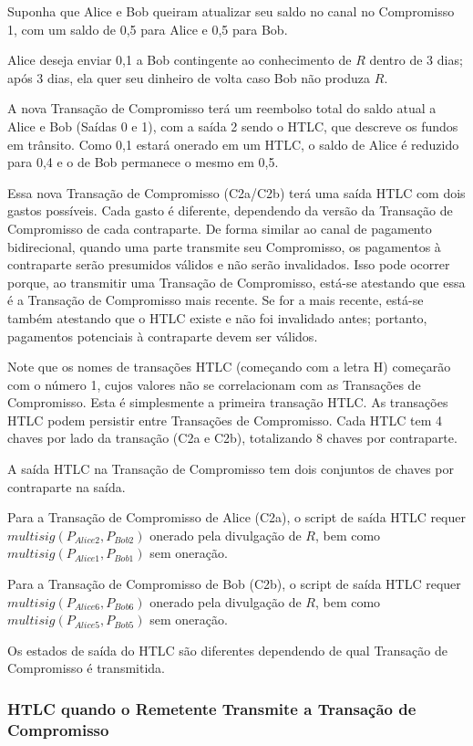 \documentclass[letterpaper,11pt]{article}
\begin{document}
Suponha que Alice e Bob queiram atualizar seu saldo no canal no
Compromisso 1, com um saldo de 0,5 para Alice e 0,5 para Bob.

Alice deseja enviar 0,1 a Bob contingente ao conhecimento de $R$ dentro de
3 dias; após 3 dias, ela quer seu dinheiro de volta caso Bob não produza
$R$.

A nova Transação de Compromisso terá um reembolso total do saldo atual a
Alice e Bob (Saídas 0 e 1), com a saída 2 sendo o HTLC, que descreve os
fundos em trânsito. Como 0,1 estará onerado em um HTLC, o saldo de Alice é
reduzido para 0,4 e o de Bob permanece o mesmo em 0,5.

Essa nova Transação de Compromisso (C2a/C2b) terá uma saída HTLC com dois
gastos possíveis. Cada gasto é diferente, dependendo da versão da Transação
de Compromisso de cada contraparte. De forma similar ao canal de
pagamento bidirecional, quando uma parte transmite seu Compromisso, os
pagamentos à contraparte serão presumidos válidos e não serão invalidados.
Isso pode ocorrer porque, ao transmitir uma Transação de Compromisso,
está-se atestando que essa é a Transação de Compromisso mais recente. Se
for a mais recente, está-se também atestando que o HTLC existe e não foi
invalidado antes; portanto, pagamentos potenciais à contraparte devem ser
válidos.

Note que os nomes de transações HTLC (começando com a letra H) começarão
com o número 1, cujos valores não se correlacionam com as Transações de
Compromisso. Esta é simplesmente a primeira transação HTLC. As transações
HTLC podem persistir entre Transações de Compromisso. Cada HTLC tem 4
chaves por lado da transação (C2a e C2b), totalizando 8 chaves por
contraparte.

A saída HTLC na Transação de Compromisso tem dois conjuntos de chaves por
contraparte na saída.

Para a Transação de Compromisso de Alice (C2a), o script de saída HTLC
requer $multisig(P_{Alice2}, P_{Bob2})$ onerado pela divulgação de $R$,
bem como $multisig(P_{Alice1}, P_{Bob1})$ sem oneração.

Para a Transação de Compromisso de Bob (C2b), o script de saída HTLC requer
$multisig(P_{Alice6}, P_{Bob6})$ onerado pela divulgação de $R$, bem como
$multisig(P_{Alice5}, P_{Bob5})$ sem oneração.

Os estados de saída do HTLC são diferentes dependendo de qual Transação de
Compromisso é transmitida.

\subsubsection{HTLC quando o Remetente Transmite a Transação de Compromisso}
\end{document}

